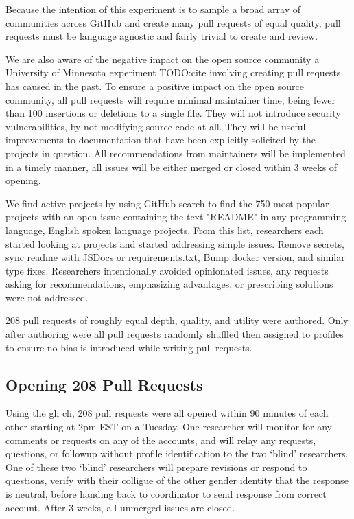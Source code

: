 \documentclass[journal,12pt,onecolumn,]{IEEEtran}
\begin{document}
Because the intention of this experiment is to sample a broad array of communities across GitHub and create many pull requests of equal quality, pull requests must be language agnostic and fairly trivial to create and review.

We are also aware of the negative impact on the open source community a University of Minnesota experiment TODO:cite involving creating pull requests has caused in the past.
To ensure a positive impact on the open source community, all pull requests will require minimal maintainer time, being fewer than 100 insertions or deletions to a single file.
They will not introduce security vulnerabilities, by not modifying source code at all.
They will be useful improvements to documentation that have been explicitly solicited by the projects in question.
All recommendations from maintainers will be implemented in a timely manner, all issues will be either merged or closed within 3 weeks of opening.

We find active projects by using GitHub search to find the 750 most popular projects with an open issue containing the text "README" in any programming language, English spoken language projects.
From this list, researchers each started looking at projects and started addressing simple issues.
Remove secrets, sync readme with JSDocs or requirements.txt, Bump docker version, and similar type fixes.
Researchers intentionally avoided opinionated issues, any requests asking for recommendations, emphasizing advantages, or prescribing solutions were not addressed.

208 pull requests of roughly equal depth, quality, and utility were authored.
Only after authoring were all pull requests randomly shuffled then assigned to profiles to ensure no bias is introduced while writing pull requests.

\subsection{Opening 208 Pull Requests}

Using the gh cli, 208 pull requests were all opened within 90 minutes of each other starting at 2pm EST on a Tuesday.
One researcher will monitor for any comments or requests on any of the accounts, and will relay any requests, questions, or followup without profile identification to the two `blind' researchers.
One of these two `blind' researchers will prepare revisions or respond to questions, verify with their colligue of the other gender identity that the response is neutral, before handing back to coordinator to send response from correct account.
After 3 weeks, all unmerged issues are closed.
\end{document}
